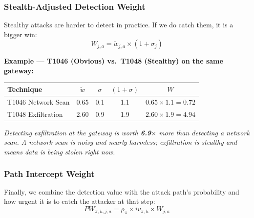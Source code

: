 \documentclass[journal]{IEEEtran}
\newcommand{\tildeW}{\tilde{w}}
\begin{document}
\subsubsection{Stealth-Adjusted Detection Weight}

Stealthy attacks are harder to detect in practice.
If we do catch them, it is a bigger win:
\begin{equation}
  W_{j,a} = \tildeW_{j,a} \times (1 + \sigma_j)
\end{equation}

\begin{examplebox}
\textbf{Example --- T1046 (Obvious) vs.\ T1048 (Stealthy)
on the same gateway:}
\begin{center}
\small
\renewcommand{\arraystretch}{1.1}
\begin{tabular}{@{}lcccc@{}}
\toprule
\textbf{Technique} & $\tildeW$ & $\sigma$ &
$(1+\sigma)$ & $W$ \\
\midrule
T1046 Network Scan  & 0.65 & 0.1 & 1.1 &
  $0.65\times1.1=\mathbf{0.72}$ \\
T1048 Exfiltration  & 2.60 & 0.9 & 1.9 &
  $2.60\times1.9=\mathbf{4.94}$ \\
\bottomrule
\end{tabular}
\end{center}
\textit{Detecting exfiltration at the gateway is worth
\textbf{6.9}$\times$ more than detecting a network scan.
A network scan is noisy and nearly harmless;
exfiltration is stealthy and means data is being stolen
right now.}
\end{examplebox}

\subsubsection{Path Intercept Weight}

Finally, we combine the detection value with the attack
path's probability and how urgent it is to catch the attacker
at that step:
\begin{equation}
  PW_{\pi,h,j,a} = \rho_\pi \times iv_{\pi,h} \times W_{j,a}
\end{equation}
\end{document}
